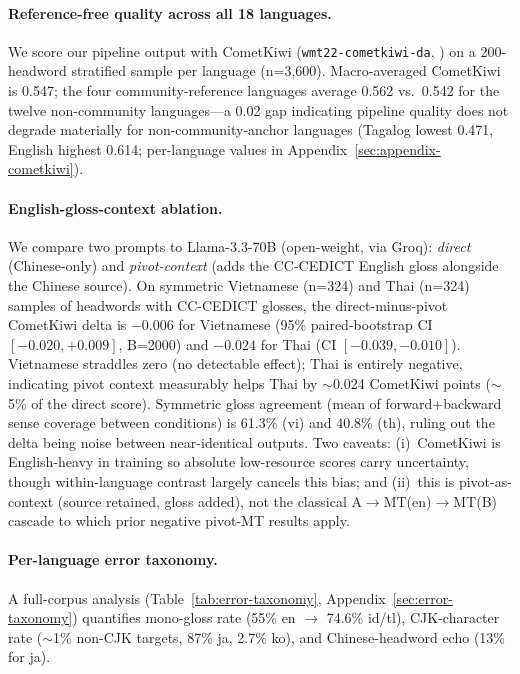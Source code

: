 \documentclass[11pt]{article}
\begin{document}
\paragraph{Reference-free quality across all 18 languages.} We score our pipeline output with CometKiwi (\texttt{wmt22-cometkiwi-da}, \citealp{rei2022cometkiwi}) on a 200-headword stratified sample per language (n=3{,}600). Macro-averaged CometKiwi is 0.547; the four community-reference languages average 0.562 vs.\ 0.542 for the twelve non-community languages---a 0.02 gap indicating pipeline quality does not degrade materially for non-community-anchor languages (Tagalog lowest 0.471, English highest 0.614; per-language values in Appendix~\ref{sec:appendix-cometkiwi}).

\paragraph{English-gloss-context ablation.} We compare two prompts to Llama-3.3-70B (open-weight, via Groq): \textit{direct} (Chinese-only) and \textit{pivot-context} (adds the CC-CEDICT English gloss alongside the Chinese source). On symmetric Vietnamese (n=324) and Thai (n=324) samples of headwords with CC-CEDICT glosses, the direct-minus-pivot CometKiwi delta is $-0.006$ for Vietnamese (95\% paired-bootstrap CI $[-0.020, +0.009]$, B=2000) and $-0.024$ for Thai (CI $[-0.039, -0.010]$). Vietnamese straddles zero (no detectable effect); Thai is entirely negative, indicating pivot context measurably helps Thai by $\sim$0.024 CometKiwi points ($\sim$5\% of the direct score). Symmetric gloss agreement (mean of forward+backward sense coverage between conditions) is 61.3\% (vi) and 40.8\% (th), ruling out the delta being noise between near-identical outputs. Two caveats: (i)~CometKiwi is English-heavy in training so absolute low-resource scores carry uncertainty, though within-language contrast largely cancels this bias; and (ii)~this is pivot-as-context (source retained, gloss added), not the classical A$\to$MT(en)$\to$MT(B) cascade to which prior negative pivot-MT results apply.

\paragraph{Per-language error taxonomy.} A full-corpus analysis (Table~\ref{tab:error-taxonomy}, Appendix~\ref{sec:error-taxonomy}) quantifies mono-gloss rate (55\% en $\rightarrow$ 74.6\% id/tl), CJK-character rate ($\sim$1\% non-CJK targets, 87\% ja, 2.7\% ko), and Chinese-headword echo (13\% for ja).
\end{document}
